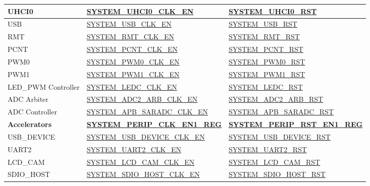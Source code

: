 \documentclass[main\_\_EN.tex]{subfiles}
\begin{document}
\begin{longtable}[c]{ |p{4cm}|p{6cm}|p{6cm}| }
UHCI0    & \hyperref[fielddesc:SYSTEMUHCI0CLKEN]{SYSTEM\_UHCI0\_CLK\_EN} & \hyperref[fielddesc:SYSTEMUHCI0RST]{SYSTEM\_UHCI0\_RST} \\\hline
USB    & \hyperref[fielddesc:SYSTEMUSBCLKEN]{SYSTEM\_USB\_CLK\_EN} & \hyperref[fielddesc:SYSTEMUSBRST]{SYSTEM\_USB\_RST} \\\hline
RMT    & \hyperref[fielddesc:SYSTEMRMTCLKEN]{SYSTEM\_RMT\_CLK\_EN} & \hyperref[fielddesc:SYSTEMRMTRST]{SYSTEM\_RMT\_RST} \\\hline
PCNT    & \hyperref[fielddesc:SYSTEMPCNTCLKEN]{SYSTEM\_PCNT\_CLK\_EN} & \hyperref[fielddesc:SYSTEMPCNTRST]{SYSTEM\_PCNT\_RST} \\\hline
PWM0    & \hyperref[fielddesc:SYSTEMPWM0CLKEN]{SYSTEM\_PWM0\_CLK\_EN} & \hyperref[fielddesc:SYSTEMPWM0RST]{SYSTEM\_PWM0\_RST} \\\hline
PWM1    & \hyperref[fielddesc:SYSTEMPWM1CLKEN]{SYSTEM\_PWM1\_CLK\_EN} & \hyperref[fielddesc:SYSTEMPWM1RST]{SYSTEM\_PWM1\_RST} \\\hline
LED\_PWM Controller    & \hyperref[fielddesc:SYSTEMLEDCCLKEN]{SYSTEM\_LEDC\_CLK\_EN} & \hyperref[fielddesc:SYSTEMLEDCRST]{SYSTEM\_LEDC\_RST} \\\hline
ADC Arbiter    & \hyperref[fielddesc:SYSTEMADC2ARBCLKEN]{SYSTEM\_ADC2\_ARB\_CLK\_EN} & \hyperref[fielddesc:SYSTEMADC2ARBRST]{SYSTEM\_ADC2\_ARB\_RST} \\\hline
ADC Controller    & \hyperref[fielddesc:SYSTEMAPBSARADCCLKEN]{SYSTEM\_APB\_SARADC\_CLK\_EN} & \hyperref[fielddesc:SYSTEMAPBSARADCRST]{SYSTEM\_APB\_SARADC\_RST} \\\hline
\textbf{Accelerators} & \textbf{\hyperref[regdesc:SYSTEMPERIPCLKEN1REG]{SYSTEM\_PERIP\_CLK\_EN1\_REG}} & \textbf{\hyperref[regdesc:SYSTEMPERIPRSTEN1REG]{SYSTEM\_PERIP\_RST\_EN1\_REG}} \\ \hline
USB\_DEVICE & \hyperref[fielddesc:SYSTEMUSBDEVICECLKEN]{SYSTEM\_USB\_DEVICE\_CLK\_EN} & \hyperref[fielddesc:SYSTEMUSBDEVICERST]{SYSTEM\_USB\_DEVICE\_RST} \\\hline
UART2 & \hyperref[fielddesc:SYSTEMUART2CLKEN]{SYSTEM\_UART2\_CLK\_EN} & \hyperref[fielddesc:SYSTEMUART2RST]{SYSTEM\_UART2\_RST} \\\hline
LCD\_CAM & \hyperref[fielddesc:SYSTEMLCDCAMCLKEN]{SYSTEM\_LCD\_CAM\_CLK\_EN} & \hyperref[fielddesc:SYSTEMLCDCAMRST]{SYSTEM\_LCD\_CAM\_RST} \\\hline
SDIO\_HOST & \hyperref[fielddesc:SYSTEMSDIOHOSTCLKEN]{SYSTEM\_SDIO\_HOST\_CLK\_EN} & \hyperref[fielddesc:SYSTEMSDIOHOSTRST]{SYSTEM\_SDIO\_HOST\_RST} \\\hline

\end{longtable}
\end{document}
